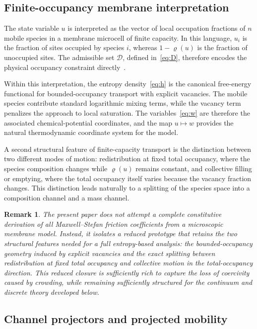 \documentclass{article}
\newtheorem{remark}[theorem]{Remark}
\newcommand{\D}{\mathcal{D}}
\begin{document}
\subsection{Finite-occupancy membrane interpretation}

The state variable $u$ is interpreted as the vector of local occupation
fractions of $n$ mobile species in a membrane microcell of finite
capacity. In this language, $u_i$ is the fraction of sites occupied by
species $i$, whereas $1-\varrho(u)$ is the fraction of unoccupied sites.
The admissible set $\D$, defined in~\eqref{eq:D}, therefore encodes the physical occupancy
constraint directly~\cite{Krishna1997,Giovangigli1999,BoetheDreyer2015}.

Within this interpretation, the entropy density~\eqref{eq:h} is the
canonical free-energy functional for bounded-occupancy transport with
explicit vacancies. The mobile species contribute standard logarithmic
mixing terms, while the vacancy term penalizes the approach to local
saturation. The variables~\eqref{eq:w} are therefore the associated
chemical-potential coordinates, and the map $u\mapsto w$ provides the
natural thermodynamic coordinate system for the model.

A second structural feature of finite-capacity transport is the
distinction between two different modes of motion: redistribution at
fixed total occupancy, where the species composition changes while
$\varrho(u)$ remains constant, and collective filling or emptying, where
the total occupancy itself varies because the vacancy fraction changes.
This distinction leads naturally to a splitting of the species space into
a composition channel and a mass channel.

\begin{remark}\label{rem:prototype}
The present paper does not attempt a complete constitutive derivation of
all Maxwell--Stefan friction coefficients from a microscopic membrane
model. Instead, it isolates a reduced prototype that retains the two
structural features needed for a full entropy-based analysis: the
bounded-occupancy geometry induced by explicit vacancies and the exact
splitting between redistribution at fixed total occupancy and collective
motion in the total-occupancy direction. This reduced closure is
sufficiently rich to capture the loss of coercivity caused by crowding,
while remaining sufficiently structured for the continuum and discrete
theory developed below.
\end{remark}

\subsection{Channel projectors and projected mobility}
\end{document}
